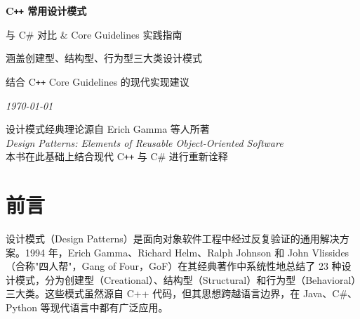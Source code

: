 \documentclass[12pt,a4paper,fontset=fandol]{ctexbook}
\begin{document}
\begin{titlepage}
\centering

\vspace*{3cm}

{\Huge\bfseries\color{blue!60!black} C\texttt{++} 常用设计模式\par}

\vspace{0.8cm}

{\LARGE\color{blue!40!black} 与 C\# 对比 \& Core Guidelines 实践指南\par}

\vspace{2cm}

\noindent\makebox[\textwidth]{\color{blue!60!black}\rule{0.6\textwidth}{1.2pt}}

\vspace{2cm}

{\large 涵盖创建型、结构型、行为型三大类设计模式\par}

\vspace{0.6cm}

{\large 结合 C\texttt{++} Core Guidelines 的现代实现建议\par}

\vspace{3cm}

{\large\itshape \today\par}

\vfill

{\small\color{gray} 设计模式经典理论源自 Erich Gamma 等人所著\\
\textit{Design Patterns: Elements of Reusable Object-Oriented Software}\\
本书在此基础上结合现代 C\texttt{++} 与 C\# 进行重新诠释\par}

\end{titlepage}

\frontmatter

\chapter{前言}

设计模式（Design Patterns）是面向对象软件工程中经过反复验证的通用解决方案。1994 年，Erich Gamma、Richard Helm、Ralph Johnson 和 John Vlissides（合称"四人帮"，Gang of Four，GoF）在其经典著作中系统性地总结了 23 种设计模式，分为创建型（Creational）、结构型（Structural）和行为型（Behavioral）三大类。这些模式虽然源自 C++ 代码，但其思想跨越语言边界，在 Java、C\#、Python 等现代语言中都有广泛应用。
\end{document}
